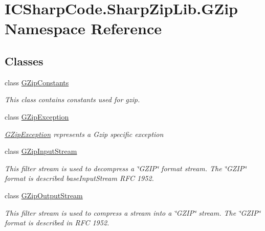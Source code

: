 \hypertarget{namespace_i_c_sharp_code_1_1_sharp_zip_lib_1_1_g_zip}{}\section{I\+C\+Sharp\+Code.\+Sharp\+Zip\+Lib.\+G\+Zip Namespace Reference}
\label{namespace_i_c_sharp_code_1_1_sharp_zip_lib_1_1_g_zip}
\subsection*{Classes}
\begin{DoxyCompactItemize}
\item 
class \hyperlink{class_i_c_sharp_code_1_1_sharp_zip_lib_1_1_g_zip_1_1_g_zip_constants}{G\+Zip\+Constants}
\begin{DoxyCompactList}\small\item\em This class contains constants used for gzip. \end{DoxyCompactList}\item 
class \hyperlink{class_i_c_sharp_code_1_1_sharp_zip_lib_1_1_g_zip_1_1_g_zip_exception}{G\+Zip\+Exception}
\begin{DoxyCompactList}\small\item\em \hyperlink{class_i_c_sharp_code_1_1_sharp_zip_lib_1_1_g_zip_1_1_g_zip_exception}{G\+Zip\+Exception} represents a Gzip specific exception \end{DoxyCompactList}\item 
class \hyperlink{class_i_c_sharp_code_1_1_sharp_zip_lib_1_1_g_zip_1_1_g_zip_input_stream}{G\+Zip\+Input\+Stream}
\begin{DoxyCompactList}\small\item\em This filter stream is used to decompress a \char`\"{}\+G\+Z\+I\+P\char`\"{} format stream. The \char`\"{}\+G\+Z\+I\+P\char`\"{} format is described base\+Input\+Stream R\+FC 1952. \end{DoxyCompactList}\item 
class \hyperlink{class_i_c_sharp_code_1_1_sharp_zip_lib_1_1_g_zip_1_1_g_zip_output_stream}{G\+Zip\+Output\+Stream}
\begin{DoxyCompactList}\small\item\em This filter stream is used to compress a stream into a \char`\"{}\+G\+Z\+I\+P\char`\"{} stream. The \char`\"{}\+G\+Z\+I\+P\char`\"{} format is described in R\+FC 1952. \end{DoxyCompactList}\end{DoxyCompactItemize}
